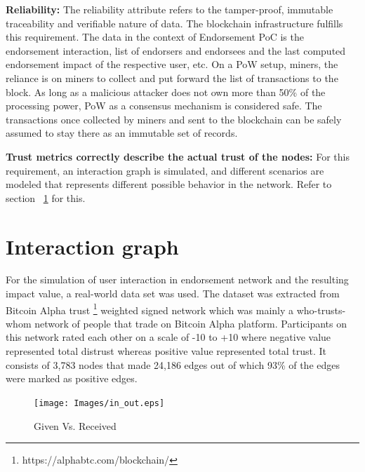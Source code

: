 \textbf{Reliability:} The reliability attribute refers to the tamper-proof,
immutable traceability and verifiable nature of data. The blockchain
infrastructure fulfills this requirement. The data in the context of
Endorsement PoC is the endorsement interaction, list of endorsers and endorsees
and the last computed endorsement impact of the respective user, etc. On a PoW
setup, miners, the reliance is on miners to collect and put forward the list of
transactions to the block. As long as a malicious attacker does not own more
than 50\% of the processing power, PoW as a consensus mechanism is considered
safe. The transactions once collected by miners and sent to the blockchain can
be safely assumed to stay there as an immutable set of records. 



\textbf{Trust metrics correctly describe the actual trust of the nodes:} For
this requirement, an interaction graph is simulated, and different scenarios
are modeled that represents different possible behavior in the network.  Refer
to section ~\ref{sec:interaction} for this.



\section{Interaction graph} \label{sec:interaction}
For the simulation of user interaction in endorsement network and the resulting
impact value, a real-world data set was used. The dataset was extracted from
Bitcoin Alpha trust  \footnote{https://alphabtc.com/blockchain/} weighted
signed network which was mainly a who-trusts-whom network of people that trade
on Bitcoin Alpha platform. Participants on this network rated each other on a
scale of -10 to +10 where negative value represented total distrust whereas
positive value represented total trust. It consists of 3,783 nodes that made
24,186 edges out of which 93\% of the edges were marked as positive
edges\cite{kumar2016edge}.\\
\begin{figure}[h]
	\texttt{[image: Images/in\_out.eps]} 
	\caption{Given Vs. Received} 
	\label{inOut}
\end{figure}

